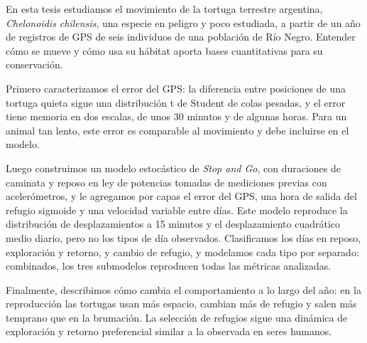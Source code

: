 \begin{resumen}%
En esta tesis estudiamos el movimiento de la tortuga terrestre argentina, \textit{Chelonoidis chilensis}, una especie
en peligro y poco estudiada, a partir de un año de registros de GPS de seis individuos de una población de Río Negro.
Entender cómo se mueve y cómo usa su hábitat aporta bases cuantitativas para su conservación.

Primero caracterizamos el error del GPS: la diferencia entre posiciones de una tortuga quieta sigue una distribución
t de Student de colas pesadas, y el error tiene memoria en dos escalas, de unos 30 minutos y de algunas horas. Para un
animal tan lento, este error es comparable al movimiento y debe incluirse en el modelo.

Luego construimos un modelo estocástico de \textit{Stop and Go}, con duraciones de caminata y reposo en ley de potencias
tomadas de mediciones previas con acelerómetros, y le agregamos por capas el error del GPS, una hora de salida del
refugio sigmoide y una velocidad variable entre días. Este modelo reproduce la distribución de desplazamientos a 15
minutos y el desplazamiento cuadrático medio diario, pero no los tipos de día observados. Clasificamos los días en
reposo, exploración y retorno, y cambio de refugio, y modelamos cada tipo por separado: combinados, los tres submodelos
reproducen todas las métricas analizadas.

Finalmente, describimos cómo cambia el comportamiento a lo largo del año: en la reproducción las tortugas usan más
espacio, cambian más de refugio y salen más temprano que en la brumación. La selección de refugios sigue una dinámica
de exploración y retorno preferencial similar a la observada en seres humanos.

\end{resumen}

\begin{abstract}%
\end{abstract}




